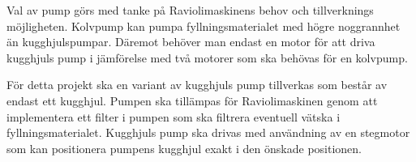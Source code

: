 Val av pump görs med tanke på Raviolimaskinens behov och tillverknings möjligheten. Kolvpump kan pumpa fyllningsmaterialet med högre noggrannhet än kugghjulspumpar. Däremot behöver man endast en motor för att driva kugghjuls pump i jämförelse med två motorer som ska behövas för en kolvpump.

För detta projekt ska en variant av kugghjuls pump tillverkas som består av endast ett kugghjul. Pumpen ska tillämpas för Raviolimaskinen genom att implementera ett filter i pumpen som ska filtrera eventuell vätska i fyllningsmaterialet. Kugghjuls pump ska drivas med användning av en stegmotor som kan positionera pumpens kugghjul exakt i den önskade positionen.
